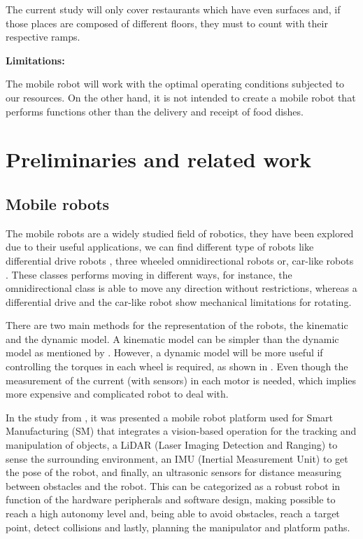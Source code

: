 The current study will only cover restaurants which have even surfaces and, if those places are composed of different floors, they must to count with their respective ramps.

\textbf{Limitations:}

The mobile robot will work with the optimal operating conditions subjected to our resources. On the other hand, it is not intended to create a mobile robot that performs functions other than the delivery and receipt of food dishes.

\cleardoublepage
\chapter{Preliminaries and related work}


\section{Mobile robots}

The mobile robots are a widely studied field of robotics, they have been explored due to their useful applications, we can find different type of robots like differential drive robots \citep{akhtar2011dynamic}, three wheeled omnidirectional robots \citep{hacene2019fuzzy} or, car-like robots \citep{wang2021training}. These classes performs moving in different ways, for instance, the omnidirectional class is able to move any direction without restrictions, whereas a differential drive and the car-like robot show mechanical limitations for rotating.

There are two main methods for the representation of the robots, the kinematic and the dynamic model. A kinematic model can be simpler than the dynamic model as mentioned by \citep{akhtar2011dynamic}. However, a dynamic model will be more useful if controlling the torques in each wheel is required, as shown in \citep{arcos2019optimal}. Even though the measurement of the current (with sensors) in each motor is needed, which implies more expensive and complicated robot to deal with.  

In the study from \citep{wang2021training}, it was presented a mobile robot platform used for Smart Manufacturing (SM) that integrates a vision-based operation for the tracking and manipulation of objects, a LiDAR (Laser Imaging Detection and Ranging) to sense the surrounding environment, an IMU (Inertial Measurement Unit) to get the pose of the robot, and finally, an ultrasonic sensors for distance measuring between obstacles and the robot. This can be categorized as a robust robot in function of the hardware peripherals and software design, making possible to reach a high autonomy level and, being able to avoid obstacles, reach a target point, detect collisions and lastly, planning the manipulator and platform paths.     

